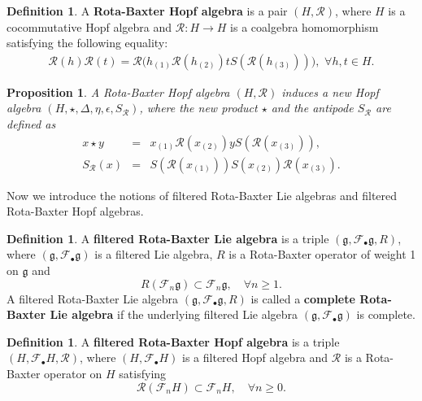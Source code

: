 \documentclass[12pt]{amsart}
\newtheorem{pro}[thm]{Proposition}
\theoremstyle{definition}   %
\newtheorem{defi}[thm]{Definition}
\newcommand{\g}{\mathfrak g}
\newcommand{\huaR}{\mathcal{R}}
\newcommand{\huaF}{\mathcal{F}}
\begin{document}
\begin{defi} {\rm\cite{Goncharov}}
A {\bf Rota-Baxter Hopf algebra} is a pair $(H,\huaR)$, where $H$ is a cocommutative Hopf algebra and $\huaR:H\to H$ is a coalgebra homomorphism satisfying the following equality:
\begin{eqnarray}\label{RBH}
\huaR(h)\huaR(t)=\huaR\Big(h_{(1)
}\huaR(h_{(2)})tS(\huaR(h_{(3)}))\Big)
,\,\,\forall h,t\in H.\end{eqnarray}
\end{defi}

\begin{pro}\label{RBH-Hopf}
A Rota-Baxter Hopf algebra $(H,\huaR)$  induces a new Hopf algebra $(H,\star,\Delta, \eta, \epsilon, S_{\huaR})$, where the new product $\star$ and the antipode $S_{\huaR}$ are defined as
\begin{eqnarray}
x\star y&=&x_{(1)}\huaR(x_{(2)})yS(\huaR(x_{(3)})), \label{nprodU}\\
\nonumber  S_{\huaR}(x)&=&S(\huaR(x_{(1)}))S(x_{(2)})\huaR(x_{(3)}).
\end{eqnarray}
\end{pro}

Now we introduce the notions of filtered Rota-Baxter Lie algebras and filtered Rota-Baxter Hopf algebras.

 \begin{defi}
 A {\bf filtered Rota-Baxter Lie algebra} is a triple $(\g, \huaF_{\bullet}\g , R)$, where $(\g,\huaF_{\bullet}\g)$ is a filtered Lie algebra, $R$ is a Rota-Baxter operator of weight 1 on $\g$ and
    $$R(\huaF_n\g)\subset \huaF_n\g,\quad \forall n\geq 1.$$
   A  filtered Rota-Baxter Lie algebra $(\g, \huaF_{\bullet}\g , R)$ is called a {\bf complete Rota-Baxter Lie algebra}  if the underlying filtered Lie algebra $(\g, \huaF_{\bullet}\g)$ is complete.
\end{defi}





\begin{defi}
A {\bf filtered Rota-Baxter Hopf algebra} is a triple $(H,\huaF_{\bullet} H,\huaR)$, where $(H,\huaF_{\bullet} H)$ is a filtered Hopf algebra and  $\huaR$ is a Rota-Baxter operator on $H$ satisfying
$$
\huaR(\huaF_nH)\subset \huaF_nH,\quad \forall n\geq 0.
$$
\end{defi}
\end{document}

